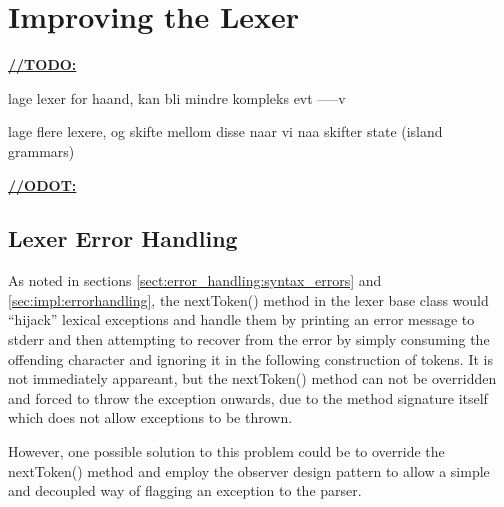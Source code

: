 \section{Improving the Lexer}


\underline{\textbf{\LARGE //TODO:}}

lage lexer for haand, kan bli mindre kompleks evt -----v

lage flere lexere, og skifte mellom disse naar vi naa skifter state (island grammars)

\underline{\textbf{\LARGE //ODOT:}}

\subsection{Lexer Error Handling}
As noted in sections \ref{sect:error_handling:syntax_errors} and
\ref{sec:impl:errorhandling}, the nextToken() method in the lexer base class
would ``hijack'' lexical exceptions and handle them by printing an error message
to stderr and then attempting to recover from the error by simply consuming the
offending character and ignoring it in the following construction of tokens. It is 
not immediately appareant, but the nextToken() method can not be overridden and
forced to throw the exception onwards, due to the method signature itself which
does not allow exceptions to be thrown. 

However, one possible solution to this problem could be to override the
nextToken() method and employ the observer design
pattern to allow a
simple and decoupled way of flagging an exception to the parser.

